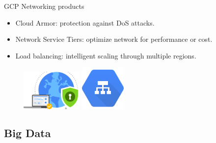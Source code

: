 \documentclass{beamer}
\begin{document}
\begin{frame}[fragile]{GCP Networking products}
  \begin{itemize}[<+->]
    \item Cloud Armor: protection against DoS attacks.
    \item Network Service Tiers: optimize network for performance or cost.
    \item Load balancing: intelligent scaling through multiple regions.
  \end{itemize}

  \vspace{1cm}
  \begin{figure}[H]
    \includegraphics[width=0.27\textwidth]{img/cloud_armor}
    \hspace{2cm}   \includegraphics[width=0.2\textwidth]{img/load_balancing}
  \end{figure}
\end{frame}

\subsection{Big Data}
\end{document}
